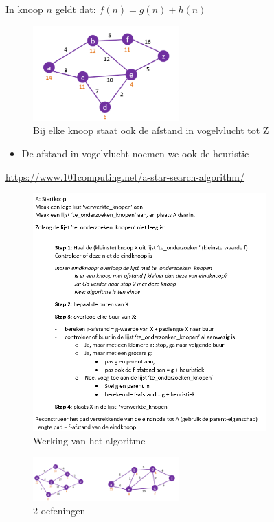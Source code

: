 \documentclass{article}
\begin{document}
In knoop $n$ geldt dat: $f(n) = g(n) + h(n)$

\begin{figure}[H]
    \centering
    \includegraphics[width=0.5\textwidth]{a-star-afstand.png}
    \caption{Bij elke knoop staat ook de afstand in vogelvlucht tot Z}
\end{figure}

\begin{itemize}
    \item De afstand in vogelvlucht noemen we ook de heuristic 
\end{itemize}

\url{https://www.101computing.net/a-star-search-algorithm/}


\begin{figure}[H]
    \centering
    \includegraphics[width=0.8\textwidth]{a-star-algoritme.png}
    \caption{Werking van het algoritme}
\end{figure}

\begin{figure}[H]
    \centering
    \includegraphics[width=0.5\textwidth]{a-star-oef.png}
    \caption{2 oefeningen}
\end{figure}
\end{document}
